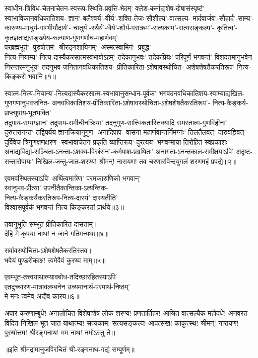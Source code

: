 
\begin{flushleft}
स्वाधीन-त्रिविध-चेतनाचेतन-स्वरूप-स्थिति-प्रवृत्ति-भेदम्'
क्लेश-कर्माद्यशेष-दोषासंस्पृष्टं' स्वाभाविकानवधिकातिशय-
ज्ञान'-बलैश्वर्य'-वीर्य'-शक्ति-तेजः सौशील्य'-वात्सल्य-
मार्दवार्जव'-सौहार्द'-साम्य'-कारुण्य-माधुर्य-गाम्भीर्यौदार्य'-
चातुर्य'-स्थैर्य'-धैर्य'-शौर्य-पराक्रम'-सत्यकाम'-सत्यसङ्कल्प'-
कृतित्व'-कृतज्ञताद्यसङ्ख्येय-कल्याण-गुणगणौघ-महार्णवम्'
\mbox{परब्रह्मभूतं' पुरुषोत्तमं' श्रीरङ्गशायिनम्' अस्मत्स्वामिनं' प्रबुद्ध'}\\
नित्य-नियाम्य' नित्य-दास्यैकरसात्मस्वभावोऽहम्'
तदेकानुभवः' तदेकप्रियः' परिपूर्णं भगवन्तं'
विशदतमानुभवेन निरन्तरमनुभूय' तदनुभव-जनितानवधिकातिशय-%
प्रीतिकारिता-ऽशेषावस्थोचित-
अशेषशेषतैकरतिरूप' नित्य-किङ्करो भवानि॥१॥


स्वात्म-नित्य-नियाम्य'-नित्यदास्यैकरसात्म-स्वभावानुसन्धान-पूर्वक'
भगवदनवधिकातिशय-स्वाम्याद्यखिल-गुणगणानुभवजनित-
अनवधिकातिशय-प्रीतिकारिता-ऽशेषावस्थोचिता-ऽशेषशेषतैकरतिरूप'-%
नित्य-कैङ्कर्य-प्राप्त्युपाय-भूतभक्ति'\\
तदुपाय-सम्यग्ज्ञान' तदुपाय-समीचीनक्रिया'
तदनुगुण-सात्त्विकतास्तिक्यादि समस्तात्म-गुणविहीनः'
दुरुत्तरानन्त' तद्विपर्यय-ज्ञानक्रियानुगुण-%
अनादिपाप- वासना-महार्णवान्तर्निमग्नः'
तिलतैलवत्' दारुवह्निवत्' दुर्विवेच-त्रिगुणक्षणक्षरण-%
स्वभावाचेतन-प्रकृति-व्याप्तिरूप'-दुरत्यय'-भगवन्माया-तिरोहित-स्वप्रकाशः'
अनाद्यविद्या-सञ्चिता-ऽनन्ता-ऽशक्य-विस्रंसन'-कर्मपाश-प्रग्रथितः'
अनागता-ऽनन्तकाल-समीक्षयाऽपि' अदृष्ट-सन्तारोपायः'
निखिल-जन्तु-जात-शरण्य! श्रीमन्! नारायण!
तव चरणारविन्दयुगलं शरणमहं प्रपद्ये॥२॥

एवमवस्थितस्याऽपि' अर्थित्वमात्रेण' परमकारुणिको भगवान्'\\
स्वानुभव-प्रीत्या' उपनीतैकान्तिका-ऽत्यन्तिक-\\
नित्य-कैङ्कर्यैकरतिरूप-नित्य-दास्यं' दास्यतीति' \\
विश्वासपूर्वकं भगवन्तं नित्य-किङ्करतां प्रार्थये॥३॥

तवानुभूति-सम्भूत-प्रीतिकारित-दासताम्।\\
देहि मे कृपया नाथ! न जाने गतिमन्यथा॥४॥

सर्वावस्थोचिता-ऽशेषशेषतैकरतिस्तव।\\
भवेयं पुण्डरीकाक्ष! त्वमेवैवं कुरुष्व माम्॥५॥

एवम्भूत-तत्त्वयाथात्म्यावबोध-तदिच्छारहितस्याऽपि'\\
एतदुच्चारण-मात्रावलम्बनेन उच्यमानार्थ-परमार्थ-निष्ठम्'\\
मे मनः त्वमेव अद्यैव कारय॥६॥

अपार-करुणाम्बुधे! अनालोचित-विशेषाशेष-लोक-शरण्य!
प्रणतार्तिहर! आश्रित-वात्सल्यैक-महोदधे! 
अनवरत-विदित-निखिल-भूत-जात-याथात्म्य!
सत्यकाम! सत्यसङ्कल्प! आपत्सख! काकुत्स्थ! श्रीमन्!
नारायण! पुरुषोत्तम! श्रीरङ्गनाथ! मम नाथ! नमोऽस्तु ते॥
\end{flushleft}
\centerline{॥इति श्रीमद्रामानुजविरचितं श्री-रङ्गनाथ-गद्यं सम्पूर्णम्॥}
